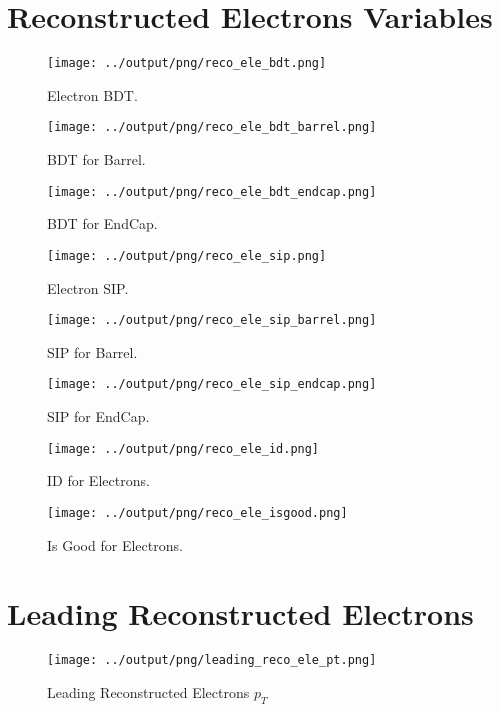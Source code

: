 \documentclass[11pt]{book}
\begin{document}
\section{Reconstructed Electrons Variables}
\begin{figure}[htb]
\centering
\texttt{[image: ../output/png/reco\_ele\_bdt.png]}
\caption{Electron BDT.}
\label{fig:reco_ele_bdt}
\end{figure}

\begin{figure}[htb]
\centering
\texttt{[image: ../output/png/reco\_ele\_bdt\_barrel.png]}
\caption{BDT for Barrel.}
\label{fig:reco_ele_bdt_barrel}
\end{figure}

\begin{figure}[htb]
\centering
\texttt{[image: ../output/png/reco\_ele\_bdt\_endcap.png]}
\caption{BDT for EndCap.}
\label{fig:reco_ele_bdt_endcap}
\end{figure}

\begin{figure}[htb]
\centering
\texttt{[image: ../output/png/reco\_ele\_sip.png]}
\caption{Electron SIP.}
\label{fig:reco_ele_sip}
\end{figure}

\begin{figure}[htb]
\centering
\texttt{[image: ../output/png/reco\_ele\_sip\_barrel.png]}
\caption{SIP for Barrel.}
\label{fig:reco_ele_sip_barrel}
\end{figure}

\begin{figure}[htb]
\centering
\texttt{[image: ../output/png/reco\_ele\_sip\_endcap.png]}
\caption{SIP for EndCap.}
\label{fig:reco_ele_sip_endcap}
\end{figure}

\begin{figure}[htb]
\centering
\texttt{[image: ../output/png/reco\_ele\_id.png]}
\caption{ID for Electrons.}
\label{fig:reco_ele_id}
\end{figure}

\begin{figure}[htb]
\centering
\texttt{[image: ../output/png/reco\_ele\_isgood.png]}
\caption{Is Good for Electrons.}
\label{fig:reco_ele_isgood}
\end{figure}
\clearpage

\section{Leading Reconstructed Electrons}
\begin{figure}[ht]
\centering
\texttt{[image: ../output/png/leading\_reco\_ele\_pt.png]}
\caption{Leading Reconstructed Electrons $p_{T}$}
\label{fig:leading_reco_ele_pt}
\end{figure}
\end{document}
